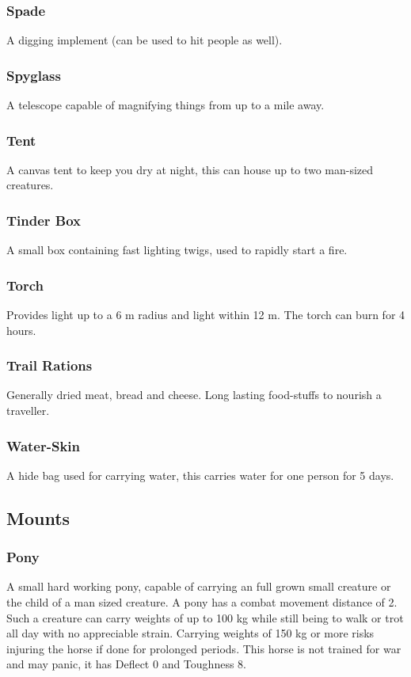\documentclass[a4paper,11pt,oneside]{book}
\newcommand{\textlf}[1]{\textbf{\titlecap{#1}}}
\begin{document}
\subsubsection*{Spade}
A digging implement (can be used to hit people as well).

\subsubsection*{Spyglass}
A telescope capable of magnifying things from up to a mile away.

\subsubsection*{Tent}
A canvas tent to keep you dry at night, this can house up to two man-sized creatures.

\subsubsection*{Tinder Box}
A small box containing fast lighting twigs, used to rapidly start a fire.

\subsubsection*{Torch}
Provides \textlf{full} light up to a 6 m radius and \textlf{low} light within 12 m. The torch can burn for 4 hours.

\subsubsection*{Trail Rations}
Generally dried meat, bread and cheese. Long lasting food-stuffs to nourish a traveller.

\subsubsection*{Water-Skin}
A hide bag used for carrying water, this carries water for one person for 5 days.

\subsection{Mounts}
\subsubsection*{Pony}
A small hard working pony, capable of carrying an full grown small creature or the child of a man sized creature. A pony has a combat movement distance of 2. Such a creature can carry weights of up to 100 kg while still being to walk or trot all day with no appreciable strain. Carrying weights of 150 kg or more risks injuring the horse if done for prolonged periods. This horse is not trained for war and may panic, it has Deflect 0 and Toughness 8.
\end{document}
